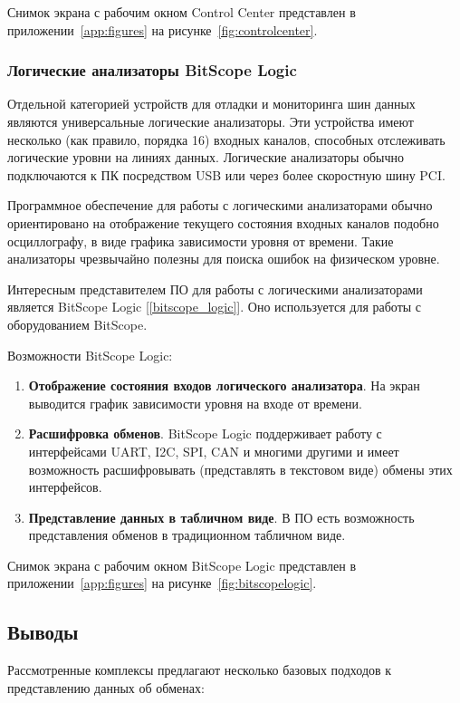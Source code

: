 Снимок экрана с рабочим окном Control Center представлен в приложении~\ref{app:figures} на рисунке~\ref{fig:controlcenter}.

\subsubsection{Логические анализаторы BitScope Logic}

Отдельной категорией устройств для отладки и мониторинга шин данных являются универсальные логические анализаторы. Эти устройства имеют несколько (как правило, порядка 16) входных каналов, способных отслеживать логические уровни на линиях данных. Логические анализаторы обычно подключаются к ПК посредством USB или через более скоростную шину PCI.

Программное обеспечение для работы с логическими анализаторами обычно ориентировано на отображение текущего состояния входных каналов подобно осциллографу, в виде графика зависимости уровня от времени. Такие анализаторы чрезвычайно полезны для поиска ошибок на физическом уровне.

Интересным представителем ПО для работы с логическими анализаторами является BitScope Logic [\ref{bitscope_logic}]. Оно используется для работы с оборудованием BitScope.

Возможности BitScope Logic:
\begin{enumerate}
 \item \textbf{Отображение состояния входов логического анализатора}. На экран выводится график зависимости уровня на входе от времени.
 \item \textbf{Расшифровка обменов}. BitScope Logic поддерживает работу с интерфейсами UART, I2C, SPI, CAN и многими другими и имеет возможность расшифровывать (представлять в текстовом виде) обмены этих интерфейсов.
 \item \textbf{Представление данных в табличном виде}. В ПО есть возможность представления обменов в традиционном табличном виде.
\end{enumerate}

Снимок экрана с рабочим окном BitScope Logic представлен в приложении~\ref{app:figures} на рисунке~\ref{fig:bitscopelogic}.

\subsection{Выводы}

Рассмотренные комплексы предлагают несколько базовых подходов к представлению данных об обменах:


